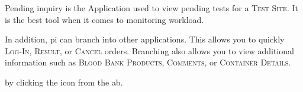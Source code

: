 Pending inquiry is the Application used to view pending tests for a \textsc{Test Site}. It is the best tool when it comes to monitoring workload.

In addition, \gls{pi} can branch into other applications. This allows you to quickly \textsc{Log-In, Result,} or \textsc{Cancel} orders. Branching also allows you to view additional information such as \textsc{Blood Bank Products, Comments}, or \textsc{Container Details}.

 by clicking the  icon from the \gls{ab}.\\

